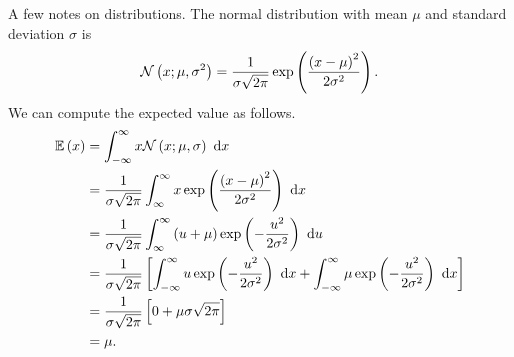 A few notes on distributions.  The normal distribution with mean $\mu$ and standard deviation $\sigma$ is
\begin{align*}
  \mathcal{N}\left(x; \mu, \sigma^{2}\right) = \frac{1}{\sigma\sqrt{2\pi}}\exp\left(\frac{\left(x-\mu\right)^{2}}{2\sigma^{2}}\right).
\end{align*}
We can compute the expected value as follows.
\begin{align*}
  \mathbb{E}\lr{x} &= \int_{-\infty}^{\infty}{x\mathcal{N}\lr{x;\mu, \sigma} \ \mathrm{d}x} \\
                   &= \frac{1}{\sigma\sqrt{2\pi}}\int_{\infty}^{\infty}{x\exp\lr{\frac{\lr{x-\mu}^{2}}{2\sigma^{2}}} \ \mathrm{d}x} \\
                   &= \frac{1}{\sigma\sqrt{2\pi}}\int_{\infty}^{\infty}{\lr{u+\mu}\exp\lr{-\frac{u^{2}}{2\sigma^{2}}} \ \mathrm{d}u} \\
                   &= \frac{1}{\sigma\sqrt{2\pi}}\left[\int_{-\infty}^{\infty}{u \exp\lr{-\frac{u^{2}}{2\sigma^{2}}}\ \mathrm{d}x} + \int_{-\infty}^{\infty}{\mu \exp\lr{-\frac{u^{2}}{2\sigma^{2}}}\ \mathrm{d}x}\right] \\
                   &= \frac{1}{\sigma\sqrt{2\pi}}\left[0 + \mu \sigma\sqrt{2\pi}\right] \\
                   &= \mu.
\end{align*}

